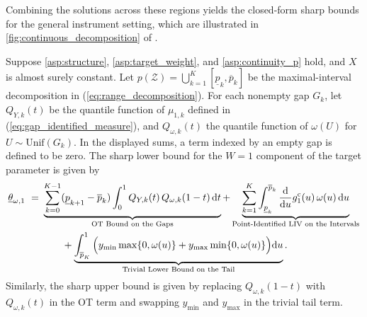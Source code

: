 Combining the solutions across these regions yields the closed-form sharp bounds for the general instrument setting, which are illustrated in \cref{fig:continuous_decomposition} of \supplocation.

\begin{theorem}\label{thm:continuous_lower_bound}
    Suppose \cref{asp:structure}, \cref{asp:target_weight}, and \cref{asp:continuity_p} hold, and $X$ is almost surely constant. Let $p(\mathcal{Z}) = \bigcup_{k=1}^{K}[\underline{p}_k, \overline{p}_k]$ be the maximal-interval decomposition in (\ref{eq:range_decomposition}). For each nonempty gap $G_k$, let $Q_{Y,k}(t)$ be the quantile function of $\mu_{1,k}$ defined in (\ref{eq:gap_identified_measure}), and $Q_{\omega,k}(t)$ the quantile function of $\omega(U)$ for $U \sim \text{Unif}(G_k)$. In the displayed sums, a term indexed by an empty gap is defined to be zero. The sharp lower bound for the $W=1$ component of the target parameter is given by
    \begin{equation}\label{eq:continuous_lower_bound}
        \begin{split}
            \underline{\theta}_{\omega,1}\ =\
            & \underbrace{\sum_{k=0}^{K-1}(\underline{p}_{k+1}-\overline{p}_k)\int_0^1 Q_{Y,k}(t)\,Q_{\omega,k}(1-t)\,\mathrm{d}t}_{\text{OT Bound on the Gaps}} + \underbrace{\sum_{k=1}^{K}\int_{\underline{p}_k}^{\overline{p}_k}\frac{{\rm d}}{{\rm d} u}g_1^{\mathrm c}(u)\,\omega(u)\,\mathrm{d}u}_{\text{Point-Identified LIV on the Intervals}} \\
            & \quad\quad + \underbrace{\int_{\overline{p}_K}^{1}\Big(y_{\min}\max\{0,\omega(u)\} + y_{\max}\min\{0,\omega(u)\}\Big)\mathrm{d}u}_{\text{Trivial Lower Bound on the Tail}}.
        \end{split}
    \end{equation}
    Similarly, the sharp upper bound is given by replacing $Q_{\omega,k}(1-t)$ with $Q_{\omega,k}(t)$ in the OT term and swapping $y_{\min}$ and $y_{\max}$ in the trivial tail term.
\end{theorem}

